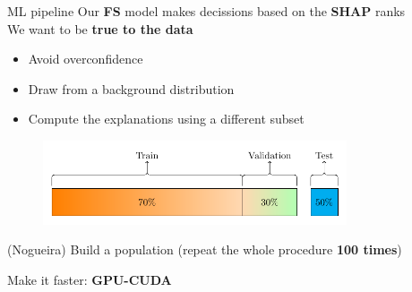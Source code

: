 \documentclass[compress,ignorenonframetext,aspectratio=1610]{beamer}
\begin{document}
\begin{frame}{ML pipeline}
		Our \textbf{FS} model makes decissions based on the \textbf{SHAP} ranks\\

		We want to be \textbf{true to the data}
		\begin{itemize}
			\item Avoid overconfidence
			\item Draw from a background distribution
			\item Compute the explanations using a different subset
		\end{itemize}

		\begin{figure}
		\centering\includegraphics[width=0.8\textwidth]{figs/methods/val.pdf}
		\end{figure}

		(Nogueira) Build a population (repeat the whole procedure \textbf{100 times})

		Make it faster: \textbf{GPU-CUDA}
\end{frame}
\end{document}
